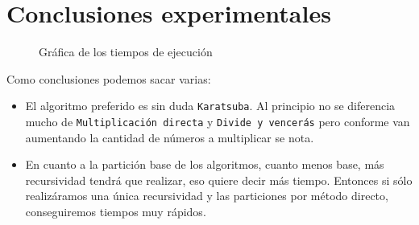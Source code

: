 \documentclass{article}
\begin{document}
\newpage
\section{Conclusiones experimentales}

\begin{figure}[htb]
\centering{\scalebox{.5}{}}
\caption{Gráfica de los tiempos de ejecución}
\end{figure}

Como conclusiones podemos sacar varias:
	\begin{itemize}
	\item El algoritmo preferido es sin duda \texttt{Karatsuba}. Al principio no se diferencia mucho de \texttt{Multiplicación directa} y \texttt{Divide y vencerás} pero conforme van aumentando la cantidad de números a multiplicar se nota.
	\item En cuanto a la partición base de los algoritmos, cuanto menos base, más recursividad tendrá que realizar, eso quiere decir más tiempo. Entonces si sólo realizáramos una única recursividad y las particiones por método directo, conseguiremos tiempos muy rápidos.
	\end{itemize}
	
\newpage


 
\end{document}
